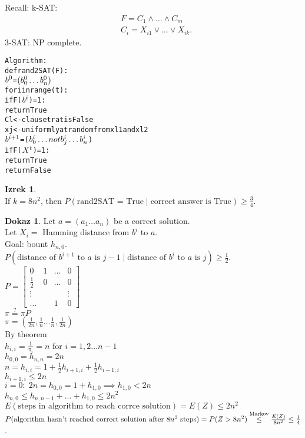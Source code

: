 \documentclass[a4paper, 12pt]{book}
\theoremstyle{definition}
\newtheorem{theorem}[counter]{Izrek}
\newtheorem{pro}[counter]{Dokaz}
\theoremstyle{remark}
\begin{document}
Recall: k-SAT:
\begin{align*}
  &F = C_1 \land \dots \land C_m \\
  &C_i = X_{i1} \lor \dots \lor X_{ik}.
\end{align*}
3-SAT: NP complete. \\
\begin{alltt}
  Algorithm:
    def rand2SAT(F):
      \(b\sp{0}\) = \((b_0\sp{0} \dots b_n\sp{0})\)
      for i in range(t):
        if F(\(b\sp{i}\)) = 1:
          return True
        Cl <- clause trat is False
        xj <- uniformly at random from xl1 and xl2
        \(b\sp{i+1}\) = (\(b_0\sp{i} \dots not b_j\sp{i} \dots b_n\sp{i}\))
      if F(\(X\sp{t}\)) = 1:
        return True
      return False
\end{alltt}
\begin{theorem} \text{} \\
  If $k = 8n^2$, then $P(\text{rand2SAT = True} \mid \text{correct answer is True}) \geq \frac{3}{4}$.
\end{theorem}
\begin{pro} \text{}
  Let $a = (a_1 \dots a_n)$ be a correct solution. \\
  Let $X_i =$ Hamming distance from $b^i$ to $a$. \\
  Goal: bount $h_{n,0}$. \\
  $P(\text{distance of } b^{i+1} \text{ to $a$ is } j-1 \mid \text{distance of $b^i$ to $a$ is } j) \geq \frac{1}{2}$. \\
  $P = \begin{bmatrix}
    0 & 1 & \dots & 0 \\
    \frac{1}{2} & 0 & \dots & 0 \\
    \vdots & & & \vdots \\
    \dots & & 1 & 0
  \end{bmatrix}$ \\
  $\pi \stackrel{?}{=} \pi P$ \\
  $\pi = (\frac{1}{2n}, \frac{1}{n} \dots \frac{1}{n}, \frac{1}{2n})$ \\
  By theorem \\
  $h_{i,i} = \frac{1}{\pi_i} = n$ for $i = 1, 2 \dots n-1$ \\
  $h_{0,0} = h_{n,n} = 2n$ \\
  $n = h_{i,i} = 1 + \frac{1}{2} h_{i+1,i} + \frac{1}{2} h_{i-1,i}$ \\
  $h_{i+1,i} \leq 2n$ \\
  $i = 0: \; 2n = h_{0,0} = 1 + h_{1,0} \implies h_{1,0} < 2n$ \\
  $h_{n,0} \leq h_{n,n-1} + \dots + h_{1,0} \leq 2n^2$ \\
  $E(\text{steps in algorithm to reach corrce solution}) = E(Z) \leq 2n^2$ \\
  $P(\text{algorithm hasn't reached correct solution after $8n^2$ steps}) \\
  = P(Z > 8n^2) \stackrel{\text{Markov}}{\leq} \frac{E(Z)}{8n^2} \leq \frac{1}{4}$.
\end{pro}
\end{document}
